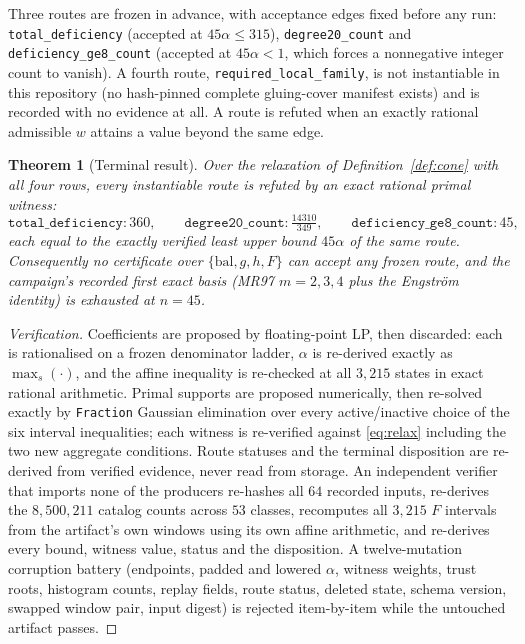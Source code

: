 \documentclass[11pt]{article}
\newtheorem{theorem}{Theorem}
\theoremstyle{definition}
\begin{document}
Three routes are frozen in advance, with acceptance edges fixed before any run:
\texttt{total\_deficiency} (accepted at $45\alpha\le315$), \texttt{degree20\_count}
and \texttt{deficiency\_ge8\_count} (accepted at $45\alpha<1$, which forces a
nonnegative integer count to vanish). A fourth route,
\texttt{required\_local\_family}, is not instantiable in this repository (no
hash-pinned complete gluing-cover manifest exists) and is recorded with no
evidence at all. A route is refuted when an exactly rational admissible $w$
attains a value beyond the same edge.

\begin{theorem}[Terminal result]\label{thm:main}
Over the relaxation of Definition~\ref{def:cone} with all four rows, every
instantiable route is refuted by an exact rational primal witness:
\[
\texttt{total\_deficiency}: 360,\qquad
\texttt{degree20\_count}: \tfrac{14310}{349},\qquad
\texttt{deficiency\_ge8\_count}: 45,
\]
each equal to the exactly verified least upper bound $45\alpha$ of the same
route. Consequently no certificate over
$\{\mathrm{bal},g,h,F\}$ can accept any frozen route, and the campaign's
recorded first exact basis (MR97 $m=2,3,4$ plus the Engstr\"om identity) is
exhausted at $n=45$.
\end{theorem}

\begin{proof}[Verification]
Coefficients are proposed by floating-point LP, then discarded: each is
rationalised on a frozen denominator ladder, $\alpha$ is re-derived exactly as
$\max_s(\cdot)$, and the affine inequality is re-checked at all $3{,}215$
states in exact rational arithmetic. Primal supports are proposed numerically,
then re-solved exactly by \texttt{Fraction} Gaussian elimination over every
active/inactive choice of the six interval inequalities; each witness is
re-verified against \eqref{eq:relax} including the two new aggregate conditions.
Route statuses and the terminal disposition are re-derived from verified
evidence, never read from storage. An independent verifier that imports none of
the producers re-hashes all $64$ recorded inputs, re-derives the
$8{,}500{,}211$ catalog counts across $53$ classes, recomputes all $3{,}215$
$F$ intervals from the artifact's own windows using its own affine arithmetic,
and re-derives every bound, witness value, status and the disposition. A
twelve-mutation corruption battery (endpoints, padded and lowered $\alpha$,
witness weights, trust roots, histogram counts, replay fields, route status,
deleted state, schema version, swapped window pair, input digest) is rejected
item-by-item while the untouched artifact passes.
\end{proof}
\end{document}
